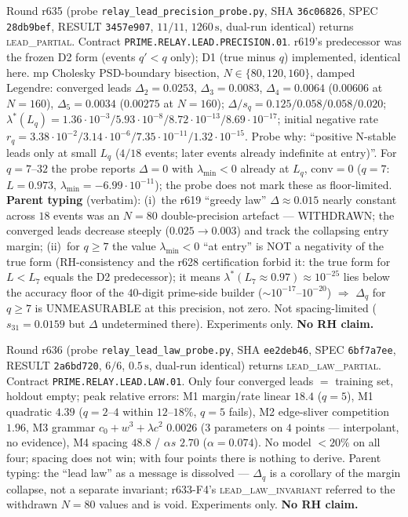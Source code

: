 \documentclass[11pt]{article}
\theoremstyle{definition}
\theoremstyle{remark}
\begin{document}
\noindent Round r635 (probe \texttt{relay\_lead\_precision\_probe.py},
SHA \texttt{36c06826}, SPEC \texttt{28db9bef}, RESULT
\texttt{3457e907}, $11/11$, $1260\,\mathrm{s}$, dual-run
identical) returns \textsc{lead\_partial}.  Contract
\texttt{PRIME.RELAY.LEAD.PRECISION.01}.  r619's predecessor
was the frozen D2 form (events $q'<q$ only); D1 (true minus
$q$) implemented, identical here.  mp Cholesky PSD-boundary
bisection, $N\in\{80,120,160\}$, damped Legendre: converged
leads $\Delta_2=0.0253$, $\Delta_3=0.0083$,
$\Delta_4=0.0064$ ($0.00606$ at $N=160$), $\Delta_5=0.0034$
($0.00275$ at $N=160$); $\Delta/s_q=0.125/0.058/0.058/0.020$;
$\lambda^*(L_q)=1.36\cdot10^{-3}/5.93\cdot10^{-8}/8.72\cdot10^{-13}/8.69\cdot10^{-17}$;
initial negative rate
$r_q=3.38\cdot10^{-2}/3.14\cdot10^{-6}/7.35\cdot10^{-11}/1.32\cdot10^{-15}$.
Probe why: ``positive N-stable leads only at small $L_q$
($4/18$ events; later events already indefinite at entry)''.
For $q=7$--$32$ the probe reports $\Delta=0$ with
$\lambda_{\min}<0$ already at $L_q$, $\mathrm{conv}=0$
($q=7$: $L=0.973$, $\lambda_{\min}=-6.99\cdot10^{-11}$);
the probe does not mark these as floor-limited.
\textbf{Parent typing} (verbatim): (i)~the r619 ``greedy
law'' $\Delta\approx 0.015$ nearly constant across $18$
events was an $N=80$ double-precision artefact ---
WITHDRAWN; the converged leads decrease steeply
($0.025\to 0.003$) and track the collapsing entry margin;
(ii)~for $q\ge 7$ the value $\lambda_{\min}<0$ ``at entry''
is NOT a negativity of the true form (RH-consistency and
the r628 certification forbid it: the true form for
$L<L_7$ equals the D2 predecessor); it means
$\lambda^*(L_7\approx 0.97)\approx 10^{-25}$ lies below the
accuracy floor of the $40$-digit prime-side builder
($\sim 10^{-17}$--$10^{-20}$) $\Rightarrow$ $\Delta_q$ for
$q\ge 7$ is UNMEASURABLE at this precision, not zero.
Not spacing-limited ($s_{31}=0.0159$ but $\Delta$
undetermined there).  Experiments only.
\textbf{No RH claim.}

\noindent Round r636 (probe \texttt{relay\_lead\_law\_probe.py},
SHA \texttt{ee2deb46}, SPEC \texttt{6bf7a7ee}, RESULT
\texttt{2a6bd720}, $6/6$, $0.5\,\mathrm{s}$, dual-run
identical) returns \textsc{lead\_law\_partial}.  Contract
\texttt{PRIME.RELAY.LEAD.LAW.01}.  Only four converged leads
$=$ training set, holdout empty; peak relative errors:
M1 margin/rate linear $18.4$ ($q=5$), M1 quadratic $4.39$
($q=2$--$4$ within $12$--$18\%$, $q=5$ fails), M2
edge-sliver competition $1.96$, M3 grammar
$c_0+w^3+\lambda c^2$ $0.0026$ ($3$ parameters on $4$
points --- interpolant, no evidence), M4 spacing $48.8$ /
$\alpha s$ $2.70$ ($\alpha=0.074$).  No model $<20\%$ on
all four; spacing does not win; with four points there is
nothing to derive.  Parent typing: the ``lead law'' as a
message is dissolved --- $\Delta_q$ is a corollary of the
margin collapse, not a separate invariant; r633-F4's
\textsc{lead\_law\_invariant} referred to the withdrawn
$N=80$ values and is void.  Experiments only.
\textbf{No RH claim.}
\end{document}
